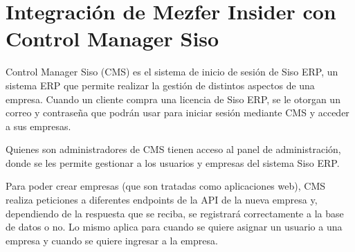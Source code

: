 \section{Integración de Mezfer Insider con Control Manager Siso}
Control Manager Siso (CMS) es el sistema de inicio de sesión de Siso ERP, un sistema ERP que permite realizar la gestión de distintos aspectos de una empresa. Cuando un cliente compra una licencia de Siso ERP, se le otorgan un correo y contraseña que podrán usar para iniciar sesión mediante CMS y acceder a sus empresas.

Quienes son administradores de CMS tienen acceso al panel de administración, donde se les permite gestionar a los usuarios y empresas del sistema Siso ERP.

Para poder crear empresas (que son tratadas como aplicaciones web), CMS realiza peticiones a diferentes endpoints de la API de la nueva empresa y, dependiendo de la respuesta que se reciba, se registrará correctamente a la base de datos o no. Lo mismo aplica para cuando se quiere asignar un usuario a una empresa y cuando se quiere ingresar a la empresa.
    
    